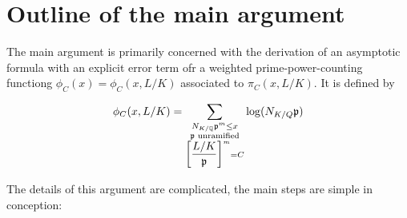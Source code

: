 \documentclass[./main]{subfiles}
\begin{document}
\section{Outline of the main argument}

The main argument is primarily concerned with the derivation of an asymptotic formula with an explicit error term ofr a weighted prime-power-counting functiong $\phi_C(x) = \phi_C(x, L/K)$ associated to $\pi_C(x, L/K)$.
It is defined by

\[
\phi_C(x, L/K) = \sum_{\substack{N_{K/\mathbb{Q}}  \mathfrak{p}^m \leq x \\ \mathfrak{p}\text{ unramified} \\ \bigg[\dfrac{L/K}{\mathfrak{p}}\bigg]^m = C }} \log(N_{K/Q} \mathfrak{p})
\]

The details of this argument are complicated, the main steps are simple in conception:
\end{document}
